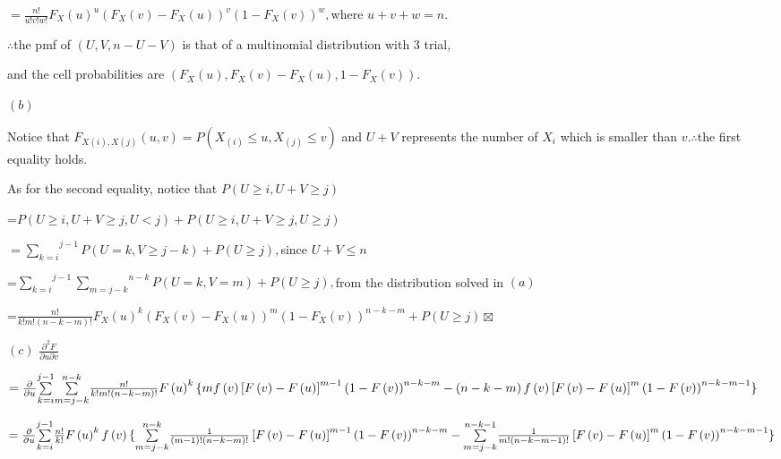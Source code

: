 \documentclass{article}
\begin{document}
$=\frac{n!}{u!v!w!}F_{X}\left( u\right) ^{u}\left( F_{X}\left( v\right)
-F_{X}\left( u\right) \right) ^{v}\left( 1-F_{X}\left( v\right) \right) ^{w},
$where $u+v+w=n.$

$\therefore $the pmf of $\left( U,V,n-U-V\right) $ is that of a multinomial
distribution with 3 trial,

and the cell probabilities are $\left( F_{X}\left( u\right) ,F_{X}\left(
v\right) -F_{X}\left( u\right) ,1-F_{X}\left( v\right) \right) $.

$\left( b\right) $

\bigskip Notice that $F_{X\left( i\right) ,X\left( j\right) }\left(
u,v\right) =P\left( X_{\left( i\right) }\leq u,X_{\left( j\right) }\leq
v\right) $ and $U+V$ represents the number of $X_{i}$ which is smaller than $%
v.\therefore $the first equality holds. 

As for the second equality, notice that $P\left( U\geq i,U+V\geq j\right) $

=$P\left( U\geq i,U+V\geq j,U<j\right) +P\left( U\geq i,U+V\geq j,U\geq
j\right) $

$=\overset{j-1}{\underset{k=i}{\sum }}P\left( U=k,V\geq j-k\right) +P\left(
U\geq j\right) ,$since $U+V\leq n$

\bigskip =$\overset{j-1}{\underset{k=i}{\sum }}\overset{n-k}{\underset{m=j-k}%
{\sum }}P\left( U=k,V=m\right) +P\left( U\geq j\right) ,$from the
distribution solved in $\left( a\right) $

=$\frac{n!}{k!m!\left( n-k-m\right) !}F_{X}\left( u\right) ^{k}\left(
F_{X}\left( v\right) -F_{X}\left( u\right) \right) ^{m}\left( 1-F_{X}\left(
v\right) \right) ^{n-k-m}+P\left( U\geq j\right) \boxtimes $

$\left( c\right) $ $\frac{\partial ^{2}F}{\partial u\partial v}$

$=\frac{\partial }{\partial u}\underset{k=i}{\overset{j-1}{\sum }}\underset{%
m=j-k}{\overset{n-k}{\sum }}\frac{n!}{k!m!\left( n-k-m\right) !}F\left(
u\right) ^{k}\{mf\left( v\right) \left[ F\left( v\right) -F\left( u\right) %
\right] ^{m-1}\left( 1-F\left( v\right) \right) ^{n-k-m}-\left( n-k-m\right)
f\left( v\right) \left[ F\left( v\right) -F\left( u\right) \right]
^{m}\left( 1-F\left( v\right) \right) ^{n-k-m-1}\}$

$=\frac{\partial }{\partial u}\underset{k=i}{\overset{j-1}{\sum }}\frac{n!}{%
k!}F\left( u\right) ^{k}f\left( v\right) \{\underset{m=j-k}{\overset{n-k}{%
\sum }}\frac{1}{\left( m-1\right) !\left( n-k-m\right) !}\left[ F\left(
v\right) -F\left( u\right) \right] ^{m-1}\left( 1-F\left( v\right) \right)
^{n-k-m}-\underset{m=j-k}{\overset{n-k-1}{\sum }}\frac{1}{m!\left(
n-k-m-1\right) !}\left[ F\left( v\right) -F\left( u\right) \right]
^{m}\left( 1-F\left( v\right) \right) ^{n-k-m-1}\}$
\end{document}

